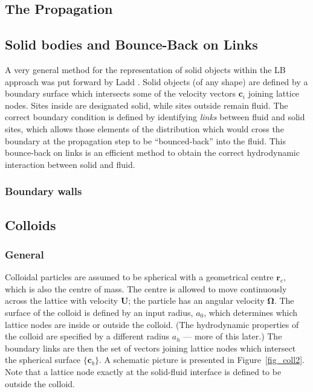 \subsection{The Propagation}



\subsection{Solid bodies and Bounce-Back on Links}

A very general method for the representation of solid objects
within the LB approach was put forward by Ladd \cite{l94a, l94b}.
Solid objects (of any shape) are defined by a boundary surface
which intersects some of the velocity vectors $\mathbf{c}_i$
joining lattice nodes. Sites inside are designated solid, while
sites outside remain fluid. The correct boundary condition is
defined by identifying \textit{links} between fluid and solid
sites, which allows those elements of the distribution which would
cross the boundary at the propagation step to be ``bounced-back''
into the fluid. This bounce-back on links is an efficient method
to obtain the  correct hydrodynamic interaction between solid
and fluid.

\subsubsection{Boundary walls}

\subsection{Colloids}

\subsubsection{General}

Colloidal particles are assumed to be spherical with a geometrical
centre $\mathbf{r}_c$, which is also the centre of mass. The
centre is allowed to move continuously across the lattice
with velocity $\mathbf{U}$; the particle has an angular velocity
$\mathbf{\Omega}$. The surface of the colloid is defined by an
input radius, $a_0$, which determines which lattice nodes are
inside or outside the colloid. (The hydrodynamic properties of
the colloid are specified by a different radius $a_h$ --- more
of this later.) The boundary links are then the set of vectors
joining lattice nodes which intersect the spherical surface
$\{\mathbf{c}_b\}$. A schematic picture is presented in
Figure~\ref{fig_coll2}. Note that a lattice node exactly at
the solid-fluid interface is defined to be outside the colloid.

